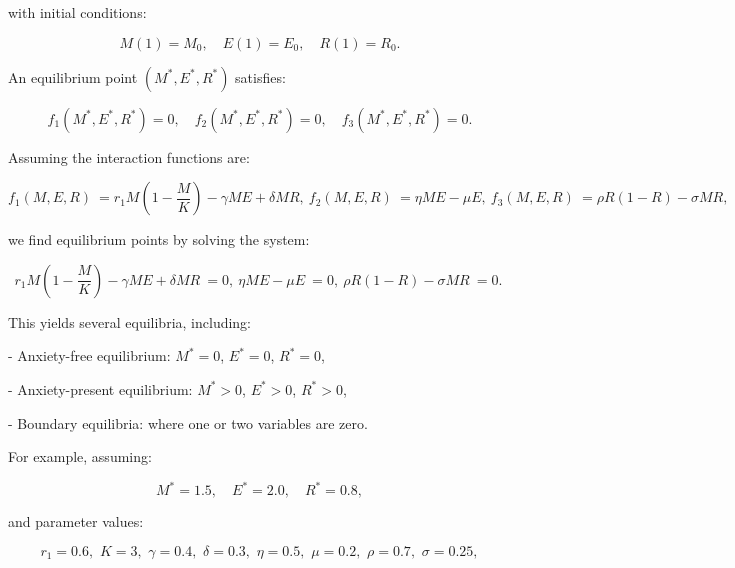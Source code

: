 \documentclass[10pt]{NSP1}
\begin{document}
with initial conditions:

\begin{equation}
M(1) = M_{0},\quad E(1) = E_{0},\quad R(1) = R_{0}.

\end{equation}

\par\medskip{}\smallskip

An equilibrium point $\left( M^{*},E^{*},R^{*} \right)$ satisfies:

\begin{equation}
f_{1}\left( M^{*},E^{*},R^{*} \right) = 0,\quad f_{2}\left( M^{*},E^{*},R^{*} \right) = 0,\quad f_{3}\left( M^{*},E^{*},R^{*} \right) = 0.

\end{equation}

Assuming the interaction functions are:

\begin{equation}
f_{1}(M,E,R)\  = r_{1}M\left( 1 - \frac{M}{K} \right) - \gamma ME + \delta MR,\ f_{2}(M,E,R)\  = \eta ME - \mu E,\ f_{3}(M,E,R)\  = \rho R(1 - R) - \sigma MR,\ 

\end{equation}

we find equilibrium points by solving the system:

\begin{equation}
r_{1}M\left( 1 - \frac{M}{K} \right) - \gamma ME + \delta MR\  = 0,\ \eta ME - \mu E\  = 0,\ \rho R(1 - R) - \sigma MR\  = 0.\ 

\end{equation}

This yields several equilibria, including:

- Anxiety-free equilibrium: $M^{*} = 0$, $E^{*} = 0$, $R^{*} = 0$,

- Anxiety-present equilibrium: $M^{*} > 0$, $E^{*} > 0$, $R^{*} > 0$,

- Boundary equilibria: where one or two variables are zero.

For example, assuming:

\begin{equation}
M^{*} = 1.5,\quad E^{*} = 2.0,\quad R^{*} = 0.8,

\end{equation}

and parameter values:

\begin{equation}
r_{1} = 0.6,\mspace{6mu} K = 3,\mspace{6mu}\gamma = 0.4,\mspace{6mu}\delta = 0.3,\mspace{6mu}\eta = 0.5,\mspace{6mu}\mu = 0.2,\mspace{6mu}\rho = 0.7,\mspace{6mu}\sigma = 0.25,

\end{equation}
\end{document}
